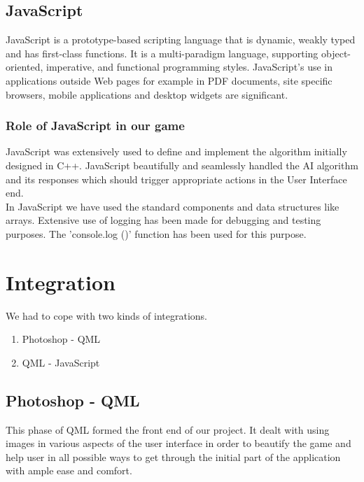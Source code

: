 \documentclass[a4paper,12pt]{article}
\begin{document}
\subsection{JavaScript}
\hspace{18pt}JavaScript is a prototype-based scripting language that is dynamic, weakly typed and has first-class functions. It is a multi-paradigm language, supporting object-oriented, imperative, and functional programming styles. JavaScript's use in applications outside Web pages for example in PDF documents, site specific browsers, mobile applications and desktop widgets are significant.

\subsubsection{Role of JavaScript in our game}
\hspace{18pt}JavaScript was extensively used to define and implement the algorithm initially designed in C++. JavaScript beautifully and seamlessly handled the AI algorithm and its responses which should trigger appropriate actions in the User Interface end.\\

In JavaScript we have used the standard components and data structures like arrays. Extensive use of logging has been made for debugging and testing purposes. The 'console.log ()' function has been used for this purpose.


\section{Integration}   
\hspace{18pt}We had to cope with two kinds of integrations. 
\begin{enumerate}
 \item Photoshop - QML
 \item QML - JavaScript
\end{enumerate}

\subsection{Photoshop - QML}
\hspace{18pt}This phase of QML formed the front end of our project. It dealt with using images in various aspects of the user interface in order to beautify the game and help user in all possible ways to get through the initial part of the application with ample ease and comfort.
\end{document}
